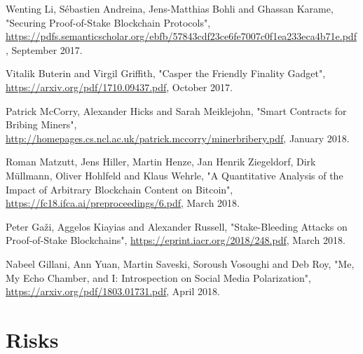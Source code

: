\documentclass[12pt,a4paper]{article}
\begin{document}
\begin{thebibliography}{9}
Wenting Li, Sébastien Andreina, Jens-Matthias Bohli and Ghassan Karame,
"Securing Proof-of-Stake Blockchain Protocols",
\url{https://pdfs.semanticscholar.org/ebfb/57843cdf23ce6fe7007c0f1ea233eca4b71e.pdf},
September 2017.

Vitalik Buterin and Virgil Griffith,
"Casper the Friendly Finality Gadget",
\url{https://arxiv.org/pdf/1710.09437.pdf},
October 2017.

Patrick McCorry, Alexander Hicks and Sarah Meiklejohn,
"Smart Contracts for Bribing Miners",
\url{http://homepages.cs.ncl.ac.uk/patrick.mccorry/minerbribery.pdf},
January 2018.

Roman Matzutt, Jens Hiller, Martin Henze, Jan Henrik Ziegeldorf, Dirk Müllmann, Oliver Hohlfeld and Klaus Wehrle,
"A Quantitative Analysis of the Impact of Arbitrary Blockchain Content on Bitcoin",
\url{https://fc18.ifca.ai/preproceedings/6.pdf},
March 2018.

Peter Gaži, Aggelos Kiayias and Alexander Russell,
"Stake-Bleeding Attacks on Proof-of-Stake Blockchains",
\url{https://eprint.iacr.org/2018/248.pdf},
March 2018.

Nabeel Gillani, Ann Yuan, Martin Saveski, Soroush Vosoughi and Deb Roy,
"Me, My Echo Chamber, and I: Introspection on Social Media Polarization",
\url{https://arxiv.org/pdf/1803.01731.pdf},
April 2018.

\end{thebibliography}

\newpage
\printglossary[type=\acronymtype]
\printglossary

\newpage
\appendix

\section{Risks}
\end{document}
